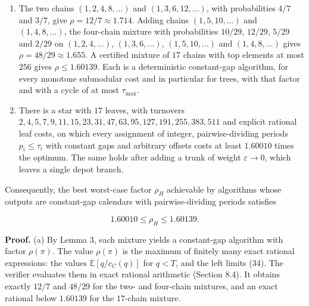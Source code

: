 \documentclass[
  british,
  11pt,
  a4paper,
]{article}
\begin{document}
\begin{enumerate}
\def\labelenumi{(\alph{enumi})}
\item
  The two chains \((1,2,4,8,\ldots)\) and \((1,3,6,12,\ldots)\), with
  probabilities \(4/7\) and \(3/7\), give \(\rho=12/7\approx1.714\).
  Adding chains \((1,5,10,\ldots)\) and \((1,4,8,\ldots)\), the
  four-chain mixture with probabilities \(10/29\), \(12/29\), \(5/29\)
  and \(2/29\) on \((1,2,4,\ldots)\), \((1,3,6,\ldots)\),
  \((1,5,10,\ldots)\) and \((1,4,8,\ldots)\) gives
  \(\rho=48/29\approx1.655\). A certified mixture of \(17\) chains with
  top elements at most \(256\) gives \(\rho\le1.60139\). Each is a
  deterministic constant-gap algorithm, for every monotone submodular
  cost and in particular for trees, with that factor and with a cycle of
  at most \(\tau_{\max}\).
\item
  There is a star with \(17\) leaves, with turnovers
  \(2,4,5,7,9,11,15,23,31,47,63,95,127,191,255,383,511\) and explicit
  rational leaf costs, on which every assignment of integer,
  pairwise-dividing periods \(p_i\le\tau_i\) with constant gaps and
  arbitrary offsets costs at least \(1.60010\) times the optimum. The
  same holds after adding a trunk of weight \(\varepsilon\to0\), which
  leaves a single depot branch.
\end{enumerate}

Consequently, the best worst-case factor \(\rho_H\) achievable by
algorithms whose outputs are constant-gap calendars with
pairwise-dividing periods satisfies

\[
1.60010\le\rho_H\le1.60139. \tag{35}
\]

\textbf{Proof.} (a) By Lemma 3, each mixture yields a constant-gap
algorithm with factor \(\rho(\pi)\). The value \(\rho(\pi)\) is the
maximum of finitely many exact rational expressions: the values
\(\mathbb E[q/c_C(q)]\) for \(q<T\), and the left limits (34). The
verifier evaluates them in exact rational arithmetic (Section 8.4). It
obtains exactly \(12/7\) and \(48/29\) for the two- and four-chain
mixtures, and an exact rational below \(1.60139\) for the \(17\)-chain
mixture.
\end{document}
